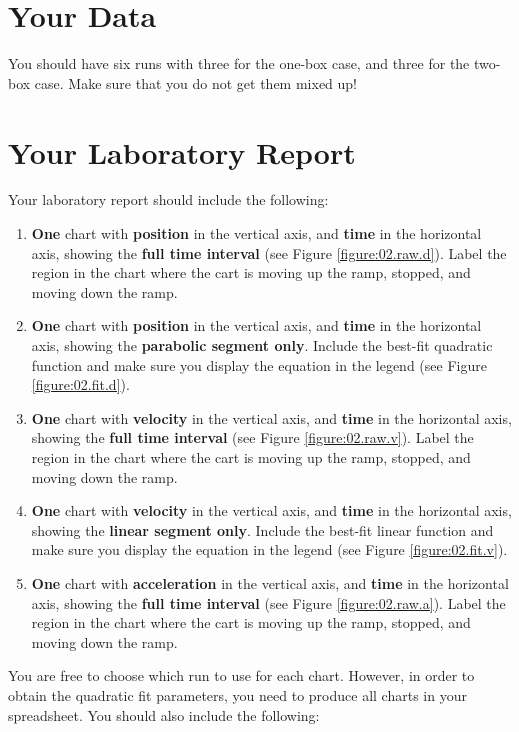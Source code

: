 \section{Your Data}
You should have six runs with three for the one-box case, and three for the two-box case. Make sure that you do not get them mixed up!
\section{Your Laboratory Report}
Your laboratory report should include the following:
\begin{enumerate}
    \item \textbf{One} chart with \textbf{position} in the vertical axis, and \textbf{time} in the horizontal axis, showing the \textbf{full time interval} (see Figure \ref{figure:02.raw.d}). Label the region in the chart where the cart is moving up the ramp, stopped, and moving down the ramp.
    \item \textbf{One} chart with \textbf{position} in the vertical axis, and \textbf{time} in the horizontal axis, showing the \textbf{parabolic segment only}. Include the best-fit quadratic function and make sure you display the equation in the legend (see Figure \ref{figure:02.fit.d}). 
    \item \textbf{One} chart with \textbf{velocity} in the vertical axis, and \textbf{time} in the horizontal axis, showing the \textbf{full time interval} (see Figure \ref{figure:02.raw.v}). Label the region in the chart where the cart is moving up the ramp, stopped, and moving down the ramp.
    \item \textbf{One} chart with \textbf{velocity} in the vertical axis, and \textbf{time} in the horizontal axis, showing the \textbf{linear segment only}. Include the best-fit linear function and make sure you display the equation in the legend (see Figure \ref{figure:02.fit.v}).
    \item \textbf{One} chart with \textbf{acceleration} in the vertical axis, and \textbf{time} in the horizontal axis, showing the \textbf{full time interval} (see Figure \ref{figure:02.raw.a}). Label the region in the chart where the cart is moving up the ramp, stopped, and moving down the ramp.
\end{enumerate}
You are free to choose which run to use for each chart. However, in order to obtain the quadratic fit parameters, you need to produce all charts in your spreadsheet. You should also include the following:
